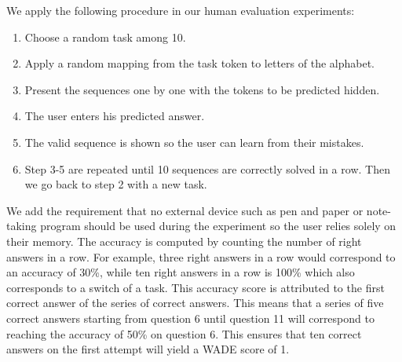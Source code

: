 We apply the following procedure in our human evaluation experiments:
\begin{enumerate}
  \item Choose a random task among 10.
  \item Apply a random mapping from the task token to letters of the alphabet.
  \item Present the sequences one by one with the tokens to be predicted hidden.
  \item The user enters his predicted answer.
  \item The valid sequence is shown so the user can learn from their mistakes.
  \item Step 3-5 are repeated until 10 sequences are correctly solved in a row.
  Then we go back to step 2 with a new task.
\end{enumerate}
We add the requirement that no external device such as pen and paper or
note-taking program should be used during the experiment so the user relies
solely on their memory. The accuracy is computed by counting the number of right
answers in a row. For example, three right answers in a row would correspond to an
accuracy of 30\%, while ten right answers in a row is 100\% which also
corresponds to a switch of a task. This accuracy score is attributed to the first
correct answer of the series of correct answers. This means that a series of five correct answers starting from question 6 until question 11 will correspond to reaching the accuracy of 50\% on question 6.
This ensures that ten correct answers on the
first attempt will yield a WADE score of 1.


